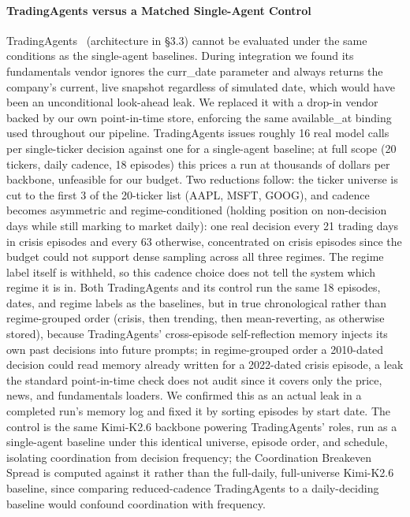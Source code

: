 \documentclass{article}
\begin{document}
\paragraph{TradingAgents versus a Matched Single-Agent Control} TradingAgents~\cite{xiao2024ta} (architecture in \S3.3) cannot be evaluated under the same conditions as the single-agent baselines. During integration we found its fundamentals vendor ignores the curr\_date parameter and always returns the company's current, live snapshot regardless of simulated date, which would have been an unconditional look-ahead leak. We replaced it with a drop-in vendor backed by our own point-in-time store, enforcing the same available\_at binding used throughout our pipeline.
TradingAgents issues roughly 16 real model calls per single-ticker decision against one for a single-agent baseline; at full scope (20 tickers, daily cadence, 18 episodes) this prices a run at thousands of dollars per backbone, unfeasible for our budget. Two reductions follow: the ticker universe is cut to the first 3 of the 20-ticker list (AAPL, MSFT, GOOG), and cadence becomes asymmetric and regime-conditioned (holding position on non-decision days while still marking to market daily): one real decision every 21 trading days in crisis episodes and every 63 otherwise, concentrated on crisis episodes since the budget could not support dense sampling across all three regimes. The regime label itself is withheld, so this cadence choice does not tell the system which regime it is in.
Both TradingAgents and its control run the same 18 episodes, dates, and regime labels as the baselines, but in true chronological rather than regime-grouped order (crisis, then trending, then mean-reverting, as otherwise stored), because TradingAgents' cross-episode self-reflection memory injects its own past decisions into future prompts; in regime-grouped order a 2010-dated decision could read memory already written for a 2022-dated crisis episode, a leak the standard point-in-time check does not audit since it covers only the price, news, and fundamentals loaders. We confirmed this as an actual leak in a completed run's memory log and fixed it by sorting episodes by start date. The control is the same Kimi-K2.6 backbone powering TradingAgents' roles, run as a single-agent baseline under this identical universe, episode order, and schedule, isolating coordination from decision frequency; the Coordination Breakeven Spread is computed against it rather than the full-daily, full-universe Kimi-K2.6 baseline, since comparing reduced-cadence TradingAgents to a daily-deciding baseline would confound coordination with frequency.
\end{document}
